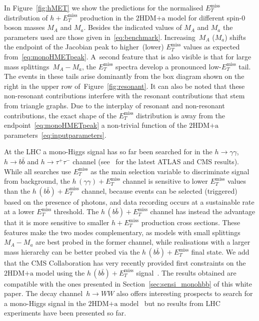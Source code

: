 \documentclass[review]{elsarticle}
\newcommand{\MET}{\ensuremath{E_T^\mathrm{miss}}\xspace}
\newcommand{\mA}{\ensuremath{M_{A}}\xspace}
\newcommand{\ma}{\ensuremath{M_{a}}\xspace}
\newcommand{\hdma}{\ensuremath{\textrm{2HDM+a}}\xspace}
\begin{document}
In Figure~\ref{fig:hMET} we show the predictions for the normalised $\MET$ distribution of $h+\MET$ production in the \hdma model for different spin-0 boson masses $\mA$ and $\ma$. Besides the indicated values of $\mA$ and $\ma$ the parameters  used  are those given in~\eqref{eq:benchmark}. Increasing~$\mA$ ($\ma$) shifts the endpoint of the Jacobian peak to higher~(lower) $\MET$  values as expected from~\eqref{eq:monoHMETpeak}. A~second feature that is also visible is that for large mass splittings~$\mA - \ma$, the $\MET$ spectra develop a pronounced low-$\MET$ tail. The events in these tails arise dominantly from the box diagram shown on the right in the upper row of~Figure~\ref{fig:resonant}. It can also be noted that these non-resonant contributions interfere with the resonant contributions that stem from triangle graphs. Due to the interplay of resonant and non-resonant contributions,  the exact shape of the $\MET$ distribution is away from the endpoint~\eqref{eq:monoHMETpeak} a non-trivial function of the \hdma parameters~\eqref{eq:inputparameters}.  

 At the LHC a mono-Higgs signal has so far been searched for in the $h \to \gamma \gamma$, $h \to b \bar b$ and $h \to \tau^+ \tau^-$ channel (see~\cite{Aaboud:2017uak,ATLAS-CONF-2018-039,Sirunyan:2018gdw,CMS:2018yme,Sirunyan:2018qob}  for the latest ATLAS and CMS results).  While all searches use $\MET$ as the main selection variable to discriminate signal from background,  the  $h \, (\gamma \gamma) + \MET$  channel  is sensitive to lower $\MET$ values than the $h \, (b \bar b) + \MET$  channel, because events can be selected (triggered) based on the presence of photons, and data recording occurs at a sustainable rate at a lower $\MET$ threshold. The $h \, (b \bar b) + \MET$  channel has instead the advantage that it is more sensitive to smaller $h + \MET$ production cross sections. These features make the two modes complementary, as models with  small  splittings $\mA - \ma$ are best probed in the former channel, while realisations with a larger mass hierarchy can be better probed via the $h \, (b \bar b) + \MET$ final state. We add that the CMS Collaboration has very recently provided first constraints on the \hdma model using the $h \, (b \bar b) + \MET$ signal~\cite{Sirunyan:2018gdw}. The results obtained are compatible with the ones presented in Section~\ref{sec:sensi_monohbb} of this white paper. The decay channel~$h \to WW$ also offers interesting prospects to search for a mono-Higgs signal in the \hdma model~\cite{GPHeidelberg} but no results from LHC experiments have been presented so far. 
\end{document}
